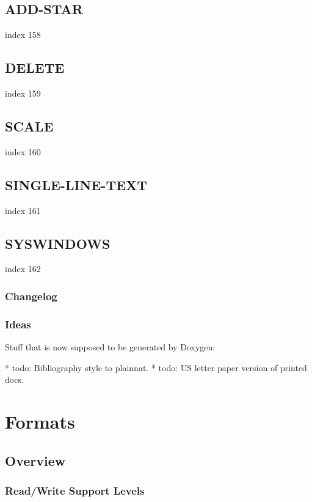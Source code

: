 \documentclass[10pt]{report}
\begin{document}
\section{ADD-STAR}

index 158

\section{DELETE}

index 159

\section{SCALE}

index 160

\section{SINGLE-LINE-TEXT}

index 161

\section{SYSWINDOWS}

index 162

\subsection{Changelog}

\subsection{Ideas}

Stuff that is now supposed to be generated by Doxygen:

* todo: Bibliography style to plainnat.
* todo: US letter paper version of printed docs.

\chapter{Formats}

\section{Overview}

\subsection{Read/Write Support Levels}
\end{document}
